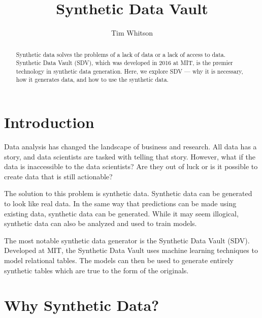 
\title{Synthetic Data Vault}

\author{Tim Whitson}

\renewcommand{\shortauthors}{T. Whitson}

\begin{abstract}
Synthetic data solves the problems of a lack of data or a lack of access to data. Synthetic Data Vault (SDV), which was developed in 2016 at MIT, is the premier technology in synthetic data generation. Here, we explore SDV --- why it is necessary, how it generates data, and how to use the synthetic data. %
\end{abstract}


\maketitle

\section{Introduction}

Data analysis has changed the landscape of business and research. All data has a story, and data scientists are tasked with telling that story. However, what if the data is inaccessible to the data scientists? Are they out of luck or is it possible to create data that is still actionable?

The solution to this problem is synthetic data. Synthetic data can be generated to look like real data. In the same way that predictions can be made using existing data, synthetic data can be generated. While it may seem illogical, synthetic data can also be analyzed and used to train models.

The most notable synthetic data generator is the Synthetic Data Vault (SDV). Developed at MIT, the Synthetic Data Vault uses machine learning techniques to model relational tables. The models can then be used to generate entirely synthetic tables which are true to the form of the originals.\cite{} %

\section{Why Synthetic Data?}

